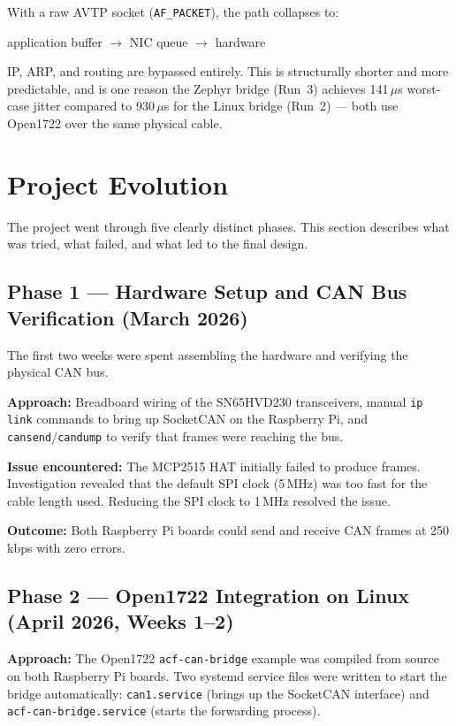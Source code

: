 \documentclass[11pt,a4paper]{article}
\begin{document}
With a raw AVTP socket (\texttt{AF\_PACKET}), the path collapses to:

\begin{center}
application buffer $\to$ NIC queue $\to$ hardware
\end{center}

IP, ARP, and routing are bypassed entirely.  This is structurally shorter and more
predictable, and is one reason the Zephyr bridge (Run~3) achieves 141\,$\mu$s worst-case
jitter compared to 930\,$\mu$s for the Linux bridge (Run~2) --- both use Open1722 over
the same physical cable.

\section{Project Evolution}
\label{sec:evolution}

The project went through five clearly distinct phases.  This section describes what was
tried, what failed, and what led to the final design.

\subsection{Phase 1 --- Hardware Setup and CAN Bus Verification (March 2026)}

The first two weeks were spent assembling the hardware and verifying the physical CAN bus.

\textbf{Approach:} Breadboard wiring of the SN65HVD230 transceivers, manual \texttt{ip link}
commands to bring up SocketCAN on the Raspberry Pi, and \texttt{cansend}/\texttt{candump}
to verify that frames were reaching the bus.

\textbf{Issue encountered:} The MCP2515 HAT initially failed to produce frames.
Investigation revealed that the default SPI clock (5\,MHz) was too fast for the cable
length used.  Reducing the SPI clock to 1\,MHz resolved the issue.

\textbf{Outcome:} Both Raspberry Pi boards could send and receive CAN frames at 250\,kbps
with zero errors.

\subsection{Phase 2 --- Open1722 Integration on Linux (April 2026, Weeks 1--2)}

\textbf{Approach:} The Open1722 \texttt{acf-can-bridge} example was compiled from source
on both Raspberry Pi boards.  Two systemd service files were written to start the bridge
automatically: \texttt{can1.service} (brings up the SocketCAN interface) and
\texttt{acf-can-bridge.service} (starts the forwarding process).
\end{document}
